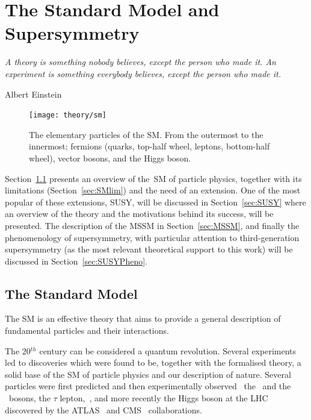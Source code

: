 \chapter{The Standard Model and Supersymmetry}
\label{ch:theory} 
\epigraph{\emph{A theory is something nobody believes, except the person who made it. An experiment is something everybody believes, except the person who made it.}} {Albert Einstein}

	\begin{figure}
		\centering
			\texttt{[image: theory/sm]}
		\caption{\label{fig:sm_el_part} The elementary particles of the \ac{SM}. From the outermost to the innermost; fermions (quarks, top-half wheel, leptons, bottom-half wheel), vector bosons, and the Higgs boson.}
	\end{figure}				

	Section~\ref{sec:SMov} presents an overview of the~\ac{SM} of particle physics, together with its limitations (Section~\ref{sec:SMlim}) and the need of an extension. One of the most popular of these extensions, \ac{SUSY}, will be discussed in Section~\ref{sec:SUSY} where an overview of the theory and the motivations behind its success, will be presented. The description of the \ac{MSSM} in Section~\ref{sec:MSSM}, and finally the phenomenology of supersymmetry, with particular attention to third-generation supersymmetry (as the most relevant theoretical support to this work) will be discussed in Section~\ref{sec:SUSYPheno}.


	\section{The Standard Model}
	\label{sec:SMov}

		The \ac{SM} is an effective theory that aims to provide a general description of fundamental particles and their interactions. %

		The 20$^{th}$ century can be considered a quantum revolution. Several experiments led to discoveries which were found to be, together with the formalised theory, a solid base of the \ac{SM} of particle physics and our description of nature. Several particles were first predicted and then experimentally observed \eg\ the \Wboson\ and the \Zboson\ bosons, the $\tau$ lepton,~\cite{Herrero1998}, and more recently the Higgs boson at the \ac{LHC} discovered by the \acs{ATLAS}~\cite{ATLASHiggs2012} and \acs{CMS}~\cite{CMSHiggs2012} collaborations.

